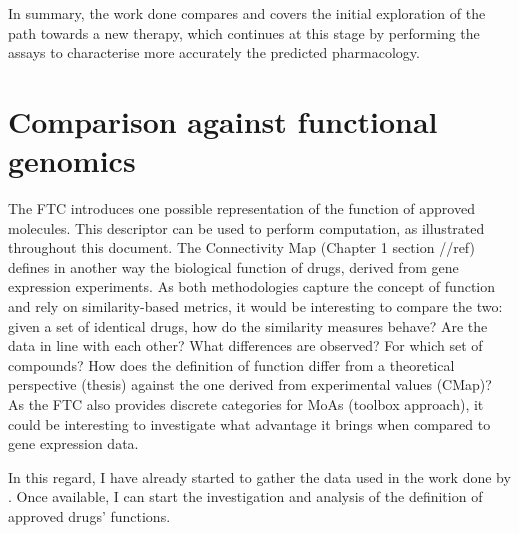 In summary, the work done compares and covers the initial exploration of the path towards a new therapy, which continues at this stage by performing the assays to characterise more accurately the predicted pharmacology.

\section{Comparison against functional genomics}
The FTC introduces one possible representation of the function of approved molecules. This descriptor can be used to perform computation, as illustrated throughout this document. The Connectivity Map (Chapter 1 section //ref) defines in another way the biological function of drugs, derived from gene expression experiments. As both methodologies capture the concept of function and rely on similarity-based metrics, it would be interesting to compare the two: given a set of identical drugs, how do the similarity measures behave? Are the data in line with each other? What differences are observed? For which set of compounds? How does the definition of function differ from a theoretical perspective (thesis) against the one derived from experimental values (CMap)? As the FTC also provides discrete categories for MoAs (toolbox approach), it could be interesting to investigate what advantage it brings when compared to gene expression data.

In this regard, I have already started to gather the data used in the work done by \cite{iorio2010discovery}. Once available, I can start the investigation and analysis of the definition of approved drugs’ functions.

